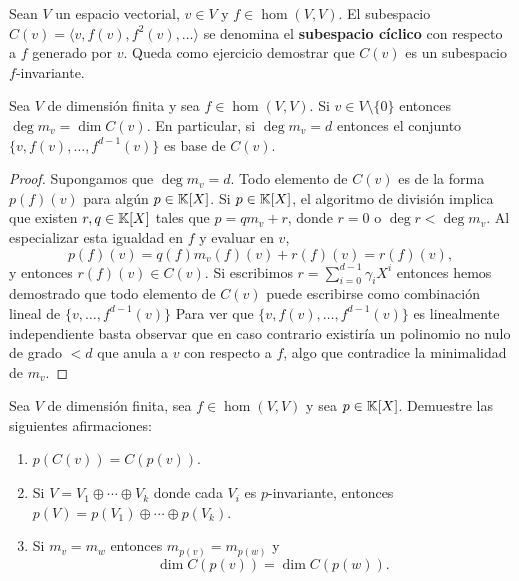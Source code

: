 \begin{block}
    Sean $V$ un espacio vectorial, $v\in V$ y $f\in\hom(V,V)$. El subespacio
    $C(v)=\langle v,f(v),f^2(v),\dots\rangle$ se denomina el \textbf{subespacio
    cíclico} con respecto a $f$ generado por $v$. Queda como ejercicio
    demostrar que $C(v)$ es un subespacio $f$-invariante.
\end{block}

\begin{lem}
    \label{lem:dimC(v)=degm_v}
	Sea $V$ de dimensión finita y sea $f\in\hom(V,V)$. Si $v\in
	V\setminus\{0\}$ entonces $\deg m_v=\dim C(v)$. En particular, si $\deg
	m_v=d$ entonces el conjunto $\{v,f(v),\dots,f^{d-1}(v)\}$ es base de
	$C(v)$. 

	\begin{proof}
		Supongamos que $\deg m_v=d$. 
		Todo elemento de $C(v)$ es de la forma $p(f)(v)$ para algún
		$p\in\mathbb{K}[X]$. Si $p\in\mathbb{K}[X]$, el algoritmo de división implica que
		existen $r,q\in\mathbb{K}[X]$ tales que $p=qm_v+r$, donde $r=0$ o $\deg r<\deg 
		m_v$. Al especializar esta igualdad en $f$ y evaluar en $v$,
		\[
			p(f)(v)=q(f)m_v(f)(v)+r(f)(v)=r(f)(v),
		\]
		y entonces $r(f)(v)\in C(v)$. Si escribimos $r=\sum_{i=0}^{d-1}\gamma_i
		X^i$ entonces hemos demostrado que todo elemento de $C(v)$ puede
		escribirse como combinación lineal de $\{v,\dots,f^{d-1}(v)\}$ Para ver
		que $\{v,f(v),\dots,f^{d-1}(v)\}$ es linealmente independiente basta
		observar que en caso contrario existiría un polinomio no nulo de grado
		$<d$ que anula a $v$ con respecto a $f$, algo que contradice la
		minimalidad de $m_v$. 
	\end{proof}
\end{lem}

\begin{xca}
	\label{xca:auxiliar}
	Sea $V$ de dimensión finita, sea $f\in\hom(V,V)$ y sea $p\in\mathbb{K}[X]$.
	Demuestre las siguientes afirmaciones:
	\begin{enumerate}
		\item $p(C(v))=C(p(v))$.
		\item Si $V=V_1\oplus\cdots\oplus V_k$ donde cada $V_i$ es $p$-invariante, entonces
			$p(V)=p(V_1)\oplus\cdots\oplus p(V_k)$. 
        \item Si $m_v=m_w$ entonces $m_{p(v)}=m_{p(w)}$ y \[
                \dim C(p(v))=\dim C(p(w)). 
              \]
	\end{enumerate}
\end{xca}


